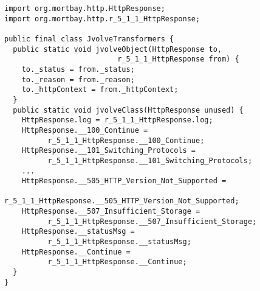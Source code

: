 \begin{figure}[t]
\centering
\begin{minipage}{0.98\textwidth}
\begin{lstlisting}[frame=single]
import org.mortbay.http.HttpResponse;
import org.mortbay.http.r_5_1_1_HttpResponse;

public final class JvolveTransformers {
  public static void jvolveObject(HttpResponse to,
                          r_5_1_1_HttpResponse from) {
    to._status = from._status;
    to._reason = from._reason;
    to._httpContext = from._httpContext;
  }
  public static void jvolveClass(HttpResponse unused) {
    HttpResponse.log = r_5_1_1_HttpResponse.log;
    HttpResponse.__100_Continue =
          r_5_1_1_HttpResponse.__100_Continue;
    HttpResponse.__101_Switching_Protocols =
          r_5_1_1_HttpResponse.__101_Switching_Protocols;
    ...
    HttpResponse.__505_HTTP_Version_Not_Supported =
          r_5_1_1_HttpResponse.__505_HTTP_Version_Not_Supported;
    HttpResponse.__507_Insufficient_Storage =
          r_5_1_1_HttpResponse.__507_Insufficient_Storage;
    HttpResponse.__statusMsg =
          r_5_1_1_HttpResponse.__statusMsg;
    HttpResponse.__Continue =
          r_5_1_1_HttpResponse.__Continue;
  }
}
\end{lstlisting}
\end{minipage}
\label{fig:jetty-update-to-5.1.2}
\VspaceFixForHangcaption
\end{figure}
